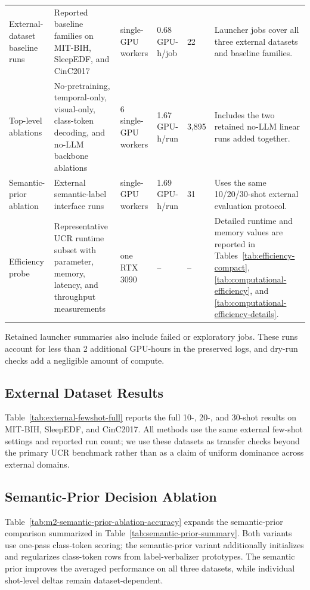 \documentclass{article}
\begin{document}
\begin{table}[t]
{\begin{tabular}{p{3.0cm}p{5.2cm}p{2.6cm}p{2.2cm}p{2.1cm}p{3.3cm}}
External-dataset baseline runs & Reported baseline families on MIT-BIH, SleepEDF, and CinC2017 & single-GPU workers & 0.68 GPU-h/job & 22 & Launcher jobs cover all three external datasets and baseline families. \\
Top-level ablations & No-pretraining, temporal-only, visual-only, class-token decoding, and no-LLM backbone ablations & 6 single-GPU workers & 1.67 GPU-h/run & 3,895 & Includes the two retained no-LLM linear runs added together. \\
Semantic-prior ablation & External semantic-label interface runs & single-GPU workers & 1.69 GPU-h/run & 31 & Uses the same 10/20/30-shot external evaluation protocol. \\
Efficiency probe & Representative UCR runtime subset with parameter, memory, latency, and throughput measurements & one RTX 3090 & -- & -- & Detailed runtime and memory values are reported in Tables~\ref{tab:efficiency-compact}, \ref{tab:computational-efficiency}, and \ref{tab:computational-efficiency-details}. \\
\bottomrule
\end{tabular}
}
\end{table}

Retained launcher summaries also include failed or exploratory jobs. These runs
account for less than 2 additional GPU-hours in the preserved logs, and dry-run
checks add a negligible amount of compute.

\subsection{External Dataset Results}
\label{app:external-results}

Table~\ref{tab:external-fewshot-full} reports the full 10-, 20-, and 30-shot results on MIT-BIH, SleepEDF, and CinC2017. All methods use the same external few-shot settings and reported run count; we use these datasets as transfer checks beyond the primary UCR benchmark rather than as a claim of uniform dominance across external domains.



\subsection{Semantic-Prior Decision Ablation}
\label{app:semantic-prior-ablation}

Table~\ref{tab:m2-semantic-prior-ablation-accuracy} expands the semantic-prior comparison summarized in Table~\ref{tab:semantic-prior-summary}. Both variants use one-pass class-token scoring; the semantic-prior variant additionally initializes and regularizes class-token rows from label-verbalizer prototypes. The semantic prior improves the averaged performance on all three datasets, while individual shot-level deltas remain dataset-dependent.
\end{document}
